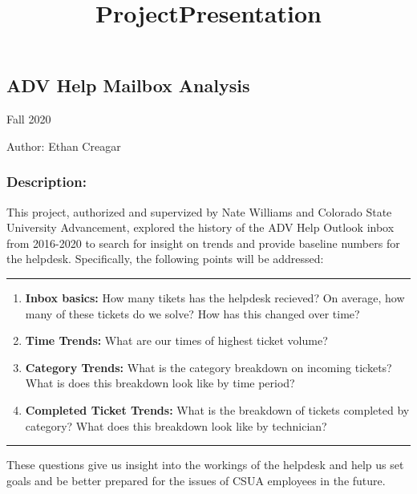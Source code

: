 \documentclass[11pt]{article}
\title{ProjectPresentation}
\begin{document}
    
\begin{center}    
    \LARGE
    \hypertarget{adv-help-mailbox-analysis}{%
\section*{ADV Help Mailbox Analysis}\label{adv-help-mailbox-analysis}}

\normalsize
Fall 2020

Author: Ethan Creagar

\end{center}

\tableofcontents
    \hypertarget{description}{%
\subsubsection{Description:}\label{description}}

This project, authorized and supervized by Nate Williams and Colorado
State University Advancement, explored the history of the ADV Help
Outlook inbox from 2016-2020 to search for insight on trends and provide
baseline numbers for the helpdesk. Specifically, the following points
will be addressed:

\begin{center}\rule{0.5\linewidth}{\linethickness}\end{center}

\begin{enumerate}
\def\labelenumi{\arabic{enumi})}
\item
  \textbf{Inbox basics:} How many tikets has the helpdesk recieved? On
  average, how many of these tickets do we solve? How has this changed
  over time?
\item
  \textbf{Time Trends:} What are our times of highest ticket volume?
\item
  \textbf{Category Trends:} What is the category breakdown on incoming
  tickets? What is does this breakdown look like by time period?
\item
  \textbf{Completed Ticket Trends:} What is the breakdown of tickets
  completed by category? What does this breakdown look like by
  technician?
\end{enumerate}

\begin{center}\rule{0.5\linewidth}{\linethickness}\end{center}

These questions give us insight into the workings of the helpdesk and
help us set goals and be better prepared for the issues of CSUA
employees in the future.
\end{document}
